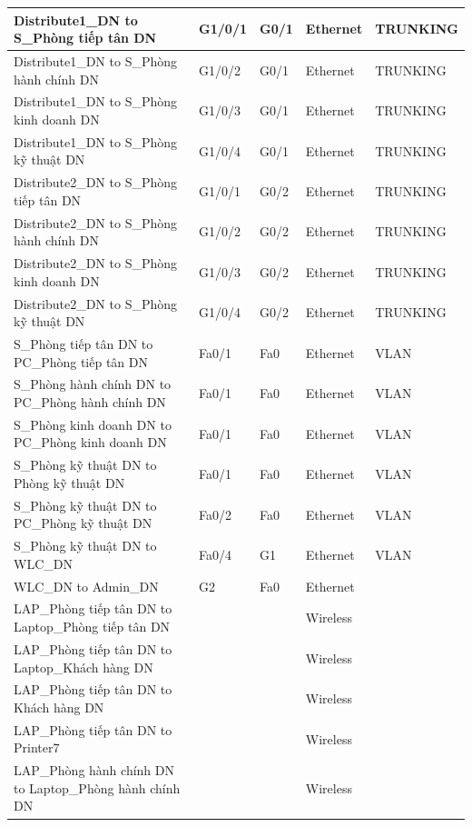\documentclass[12pt,a4paper]{report}
\begin{document}
\begin{center}
\begin{longtable}{|p{}|p{}|p{}|p{}|p{}|}
\hline  Distribute1\_DN  to  S\_Phòng tiếp tân DN  &  G1/0/1  &  G0/1  &  Ethernet  &  TRUNKING \\
\hline  Distribute1\_DN  to  S\_Phòng hành chính DN  &  G1/0/2  &  G0/1  &  Ethernet  &  TRUNKING \\
\hline  Distribute1\_DN  to  S\_Phòng kinh doanh DN  &  G1/0/3  &  G0/1  &  Ethernet  &  TRUNKING \\
\hline  Distribute1\_DN  to  S\_Phòng kỹ thuật DN  &  G1/0/4  &  G0/1  &  Ethernet  &  TRUNKING \\
\hline  Distribute2\_DN  to  S\_Phòng tiếp tân DN  &  G1/0/1  &  G0/2  &  Ethernet  &  TRUNKING \\
\hline  Distribute2\_DN  to  S\_Phòng hành chính DN  &  G1/0/2  &  G0/2  &  Ethernet  &  TRUNKING \\
\hline  Distribute2\_DN  to  S\_Phòng kinh doanh DN  &  G1/0/3  &  G0/2  &  Ethernet  &  TRUNKING \\
\hline  Distribute2\_DN  to  S\_Phòng kỹ thuật DN  &  G1/0/4  &  G0/2  &  Ethernet  &  TRUNKING \\
\hline  S\_Phòng tiếp tân DN  to  PC\_Phòng tiếp tân DN  &  Fa0/1  &  Fa0  &  Ethernet  &  VLAN \\
\hline  S\_Phòng hành chính DN  to  PC\_Phòng hành chính DN  &  Fa0/1  &  Fa0  &  Ethernet  &  VLAN \\
\hline  S\_Phòng kinh doanh DN  to  PC\_Phòng kinh doanh DN  &  Fa0/1  &  Fa0  &  Ethernet  &  VLAN \\
\hline  S\_Phòng kỹ thuật DN  to  Phòng kỹ thuật DN  &  Fa0/1  &  Fa0  &  Ethernet  &  VLAN \\
\hline  S\_Phòng kỹ thuật DN  to  PC\_Phòng kỹ thuật DN  &  Fa0/2  &  Fa0  &  Ethernet  &  VLAN \\
\hline  S\_Phòng kỹ thuật DN  to  WLC\_DN  &  Fa0/4  &  G1  &  Ethernet  &  VLAN \\
\hline  WLC\_DN  to  Admin\_DN  &  G2  &  Fa0  &  Ethernet  &   \\
\hline  LAP\_Phòng tiếp tân DN  to  Laptop\_Phòng tiếp tân DN  &    &    &  Wireless  &   \\
\hline  LAP\_Phòng tiếp tân DN  to  Laptop\_Khách hàng DN  &    &    &  Wireless  &   \\
\hline  LAP\_Phòng tiếp tân DN  to  Khách hàng DN  &    &    &  Wireless  &   \\
\hline  LAP\_Phòng tiếp tân DN  to  Printer7  &    &    &  Wireless  &   \\
\hline  LAP\_Phòng hành chính DN  to  Laptop\_Phòng hành chính DN  &    &    &  Wireless  &   \\

\end{longtable}
\end{center}
\end{document}
